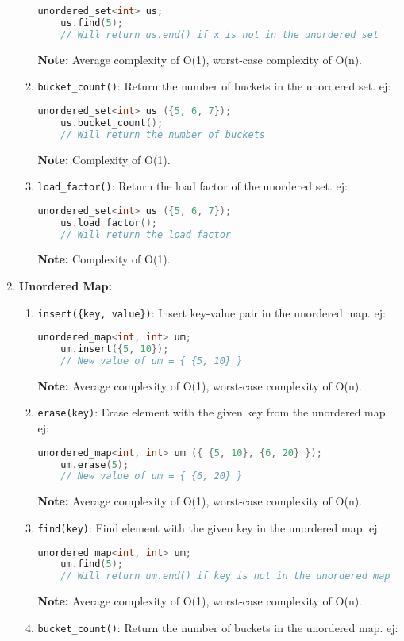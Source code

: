 \begin{enumerate}
\begin{enumerate}
\begin{lstlisting}[language=C++]
	unordered_set<int> us;
	us.find(5);
	// Will return us.end() if x is not in the unordered set
	\end{lstlisting}
	\textbf{Note:} Average complexity of O(1), worst-case complexity of O(n).
      \item \texttt{bucket\_count()}: Return the number of buckets in the unordered set. ej:
	\begin{lstlisting}[language=C++]
	unordered_set<int> us ({5, 6, 7});
	us.bucket_count();
	// Will return the number of buckets
	\end{lstlisting}
	\textbf{Note:} Complexity of O(1).
      \item \texttt{load\_factor()}: Return the load factor of the unordered set. ej:
	\begin{lstlisting}[language=C++]
	unordered_set<int> us ({5, 6, 7});
	us.load_factor();
	// Will return the load factor
	\end{lstlisting}
	\textbf{Note:} Complexity of O(1).
    \end{enumerate}
  \item \textbf{Unordered Map:}
    \begin{enumerate}
      \item \texttt{insert(\{key, value\})}: Insert key-value pair in the unordered map. ej:
	\begin{lstlisting}[language=C++]
	unordered_map<int, int> um;
	um.insert({5, 10});
	// New value of um = { {5, 10} }
	\end{lstlisting}
	\textbf{Note:} Average complexity of O(1), worst-case complexity of O(n).
      \item \texttt{erase(key)}: Erase element with the given key from the unordered map. ej:
	\begin{lstlisting}[language=C++]
	unordered_map<int, int> um ({ {5, 10}, {6, 20} });
	um.erase(5);
	// New value of um = { {6, 20} }
	\end{lstlisting}
	\textbf{Note:} Average complexity of O(1), worst-case complexity of O(n).
      \item \texttt{find(key)}: Find element with the given key in the unordered map. ej:
	\begin{lstlisting}[language=C++]
	unordered_map<int, int> um;
	um.find(5);
	// Will return um.end() if key is not in the unordered map
	\end{lstlisting}
	\textbf{Note:} Average complexity of O(1), worst-case complexity of O(n).
      \item \texttt{bucket\_count()}: Return the number of buckets in the unordered map. ej:

\end{enumerate}
\end{enumerate}
